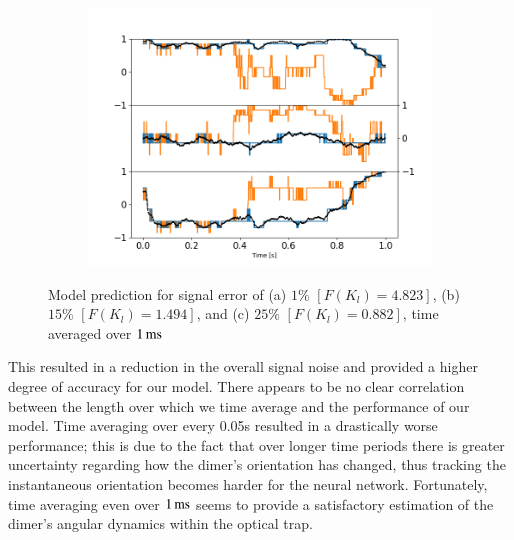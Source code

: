 \documentclass[preprint,  3p]{elsarticle}
\begin{document}
\begin{figure}[h]
\begin{subfigure}{0.32\textwidth}
		\includegraphics[width=\textwidth]{./Images/fig11c.png}
	\end{subfigure}
	\caption{Model prediction for signal error of (a) $1\%$ $[F(K_l)=4.823]$,  (b) $15\%$ $[F(K_l)=1.494]$, and (c) $25\%$ $[F(K_l)=0.882]$, time averaged over $1\,{\rm ms}$}
	\label{fig:time average}
\end{figure}
This resulted in a reduction in the overall signal noise and provided a higher degree of accuracy for our model. There appears to be no clear correlation between the length over which we time average and the performance of our model. Time averaging over every 0.05s resulted in a drastically worse performance; this is due to the fact that over longer time periods there is greater uncertainty regarding how the dimer's orientation has changed, thus tracking the instantaneous orientation becomes harder for the neural network. Fortunately, time averaging even over $1\,{\rm ms}$ seems to provide a satisfactory estimation of the dimer's angular dynamics within the optical trap.
\end{document}
